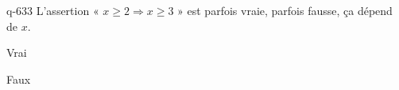 \begin{truefalse}{q-633}
L'assertion « $x\geq 2 \Rightarrow x \geq 3$ » est parfois vraie, parfois fausse, ça dépend de $x$.
\item* Vrai
\item Faux
\end{truefalse}

